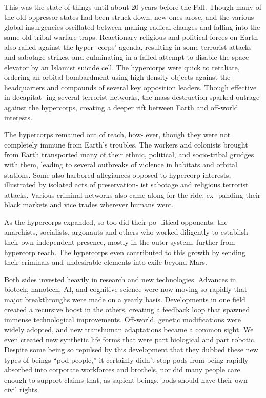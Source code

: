 This was the state of things until about 20 years 
before the Fall. Though many of the old oppressor 
states had been struck down, new ones arose, and 
the various global insurgencies oscillated between 
making radical changes and falling into the same 
old tribal warfare traps. Reactionary religious and 
political forces on Earth also railed against the hyper-
corps' agenda, resulting in some terrorist attacks and 
sabotage strikes, and culminating in a failed attempt 
to disable the space elevator by an Islamist suicide 
cell. The hypercorps were quick to retaliate, ordering 
an orbital bombardment using high-density objects 
against the headquarters and compounds of several 
key opposition leaders. Though effective in decapitat-
ing several terrorist networks, the mass destruction 
sparked outrage against the hypercorps, creating a 
deeper rift between Earth and off-world interests.

The hypercorps remained out of reach, how-
ever, though they were not completely immune from 
Earth's troubles. The workers and colonists brought 
from Earth transported many of their ethnic, political, 
and socio-tribal grudges with them, leading to several 
outbreaks of violence in habitats and orbital stations. 
Some also harbored allegiances opposed to hypercorp 
interests, illustrated by isolated acts of preservation-
ist sabotage and religious terrorist attacks. Various 
criminal networks also came along for the ride, ex-
panding their black markets and vice trades wherever 
humans went.

As the hypercorps expanded, so too did their po-
litical opponents: the anarchists, socialists, argonauts 
and others who worked diligently to establish their 
own independent presence, mostly in the outer system, 
further from hypercorp reach. The hypercorps even 
contributed to this growth by sending their criminals 
and undesirable elements into exile beyond Mars.

Both sides invested heavily in research and new 
technologies. Advances in biotech, nanotech, AI, and 
cognitive science were now moving so rapidly that 
major breakthroughs were made on a yearly basis. 
Developments in one field created a recursive boost 
in the others, creating a feedback loop that spawned 
immense technological improvements. Off-world, 
genetic modifications were widely adopted, and new 
transhuman adaptations became a common sight. We 
even created new synthetic life forms that were part 
biological and part robotic. Despite some being so 
repulsed by this development that they dubbed these 
new types of beings ``pod people,'' it certainly didn't 
stop pods from being rapidly absorbed into corporate 
workforces and brothels, nor did many people care 
enough to support claims that, as sapient beings, pods 
should have their own civil rights.

